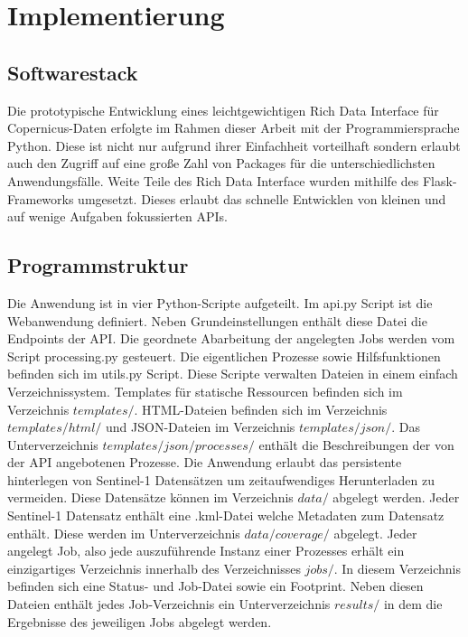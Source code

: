 \newpage
\restoregeometry
\section{Implementierung}
\subsection{Softwarestack}
Die prototypische Entwicklung eines leichtgewichtigen Rich Data Interface für Copernicus-Daten erfolgte im Rahmen dieser Arbeit mit der Programmiersprache Python.
Diese ist nicht nur aufgrund ihrer Einfachheit vorteilhaft sondern erlaubt auch den Zugriff auf eine große Zahl von Packages für die unterschiedlichsten 
Anwendungsfälle. 
Weite Teile des Rich Data Interface wurden mithilfe des Flask-Frameworks umgesetzt. Dieses erlaubt das schnelle Entwicklen von kleinen und auf wenige Aufgaben
fokussierten APIs. 

\subsection{Programmstruktur}
Die Anwendung ist in vier Python-Scripte aufgeteilt. Im api.py Script ist die Webanwendung definiert. Neben Grundeinstellungen enthält diese Datei
die Endpoints der API. Die geordnete Abarbeitung der angelegten Jobs werden vom Script processing.py gesteuert. Die eigentlichen Prozesse sowie 
Hilfsfunktionen befinden sich im utils.py Script.
Diese Scripte verwalten Dateien in einem einfach Verzeichnissystem. Templates für statische Ressourcen befinden sich im Verzeichnis $templates/$. HTML-Dateien 
befinden sich im Verzeichnis $templates/html/$ und JSON-Dateien im Verzeichnis $templates/json/$. Das Unterverzeichnis $templates/json/processes/$ enthält die 
Beschreibungen der von der API angebotenen Prozesse. Die Anwendung erlaubt das persistente hinterlegen von Sentinel-1 Datensätzen um zeitaufwendiges 
Herunterladen zu vermeiden. Diese Datensätze können im Verzeichnis $data/$ abgelegt werden. Jeder Sentinel-1 Datensatz enthält eine .kml-Datei welche 
Metadaten zum Datensatz enthält. Diese werden im Unterverzeichnis $data/coverage/$ abgelegt. 
Jeder angelegt Job, also jede auszuführende Instanz einer Prozesses erhält ein einzigartiges Verzeichnis innerhalb des Verzeichnisses $jobs/$. In diesem 
Verzeichnis befinden sich eine Status- und Job-Datei sowie ein Footprint. Neben diesen Dateien enthält jedes Job-Verzeichnis ein Unterverzeichnis $results/$ in dem
die Ergebnisse des jeweiligen Jobs abgelegt werden.  

